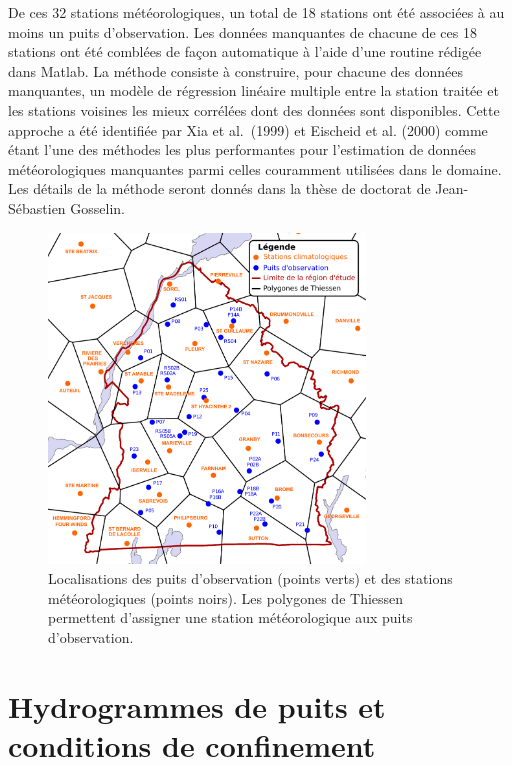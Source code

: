 \documentclass[WHATMANUAL.tex]{subfiles}
\begin{document}
De ces 32 stations météorologiques, un total de 18 stations ont été associées à au moins un puits d'observation. Les données manquantes de chacune de ces 18 stations ont été comblées de façon automatique à l'aide d'une routine rédigée dans Matlab. La méthode consiste à construire, pour chacune des données manquantes, un modèle de régression linéaire multiple entre la station traitée et les stations voisines les mieux corrélées dont des données sont disponibles. Cette approche a été identifiée par Xia et al. (1999) et Eischeid et al. (2000) comme étant l'une des méthodes les plus performantes pour l'estimation de données météorologiques manquantes parmi celles couramment utilisées dans le domaine. Les détails de la méthode seront donnés dans la thèse de doctorat de Jean-Sébastien Gosselin.

\begin{figure}
\centering
\includegraphics[width=0.75\textwidth]{img/Thiessen_meteo_wells}
\caption[Conditions de confinements déduites des hydrogrammes de puits (points) par rapport à la carte des conditions de confinement de l’aquifère rocheux régional.]{Localisations des puits d’observation (points verts) et des stations météorologiques (points noirs). Les polygones de Thiessen permettent d’assigner une station météorologique aux puits d’observation.}
\label{fig:tab_hydrograph_layout}
\end{figure}

\section{Hydrogrammes de puits et conditions de confinement}
\end{document}
